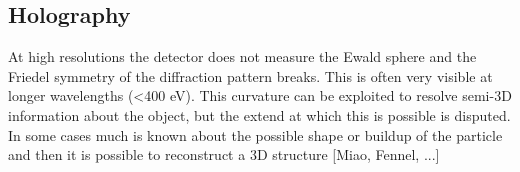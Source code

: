\subsection{Holography}
At high resolutions the detector does not measure the Ewald sphere and the Friedel symmetry of the diffraction pattern breaks. This is often very visible at longer wavelengths (<400 eV). This curvature can be exploited to resolve semi-3D information about the object, but the extend at which this is possible is disputed. In some cases much is known about the possible shape or buildup of the particle and then it is possible to reconstruct a 3D structure [Miao, Fennel, ...]
